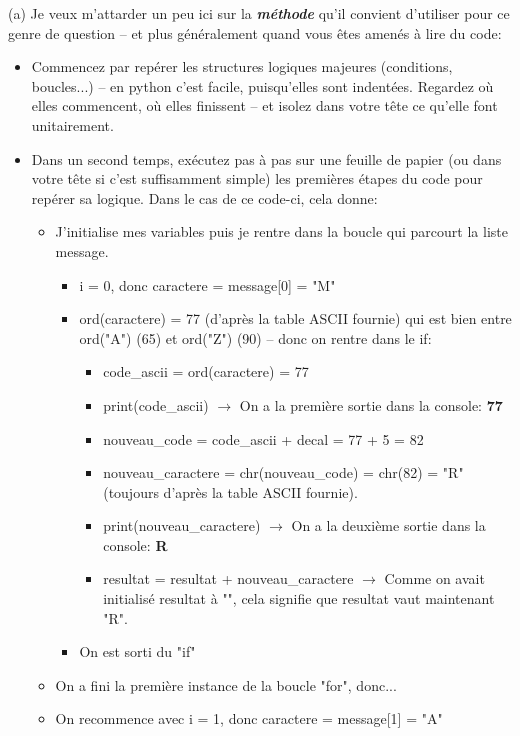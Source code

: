 \documentclass[11pt,a4paper]{exam}
\begin{document}
\begin{questions}
\begin{spacing}{1}
			\begin{solution}
				(a) Je veux m'attarder un peu ici sur la \textit{\textbf{méthode}} qu'il convient d'utiliser pour ce genre de question -- et plus généralement quand vous êtes amenés à lire du code:
				\begin{itemize}
					\item Commencez par repérer les structures logiques majeures (conditions, boucles...) -- en python c'est facile, puisqu'elles sont indentées. Regardez où elles commencent, où elles finissent -- et isolez dans votre tête ce qu'elle font unitairement.
					\item Dans un second temps, exécutez pas à pas sur une feuille de papier (ou dans votre tête si c'est suffisamment simple) les premières étapes du code pour repérer sa logique. Dans le cas de ce code-ci, cela donne:
					\begin{itemize}
						\item J'initialise mes variables puis je rentre dans la boucle qui parcourt la liste message.
						\begin{itemize}
							\item i = 0, donc caractere = message[0] = "M"
							\item ord(caractere) = 77 (d'après la table ASCII fournie) qui est bien entre ord("A") (65) et ord("Z") (90) -- donc on rentre dans le if:
							\begin{itemize}
								\item code\_ascii = ord(caractere) = 77
								\item print(code\_ascii) $\rightarrow$ On a la première sortie dans la console: \textbf{77}
								\item nouveau\_code = code\_ascii + decal = 77 + 5 = 82
								\item nouveau\_caractere = chr(nouveau\_code) = chr(82) = "R" (toujours d'après la table ASCII fournie).
								\item print(nouveau\_caractere) $\rightarrow$ On a la deuxième sortie dans la console: \textbf{R}
								\item resultat = resultat + nouveau\_caractere $\rightarrow$ Comme on avait initialisé resultat à "", cela signifie que resultat vaut maintenant "R".
							\end{itemize}
							\item On est sorti du "if"
						\end{itemize}
						\item On a fini la première instance de la boucle "for", donc...
						\item On recommence avec i = 1, donc caractere = message[1] = "A"
					\end{itemize}
				\end{itemize}
				

\end{solution}
\end{spacing}
\end{questions}
\end{document}
